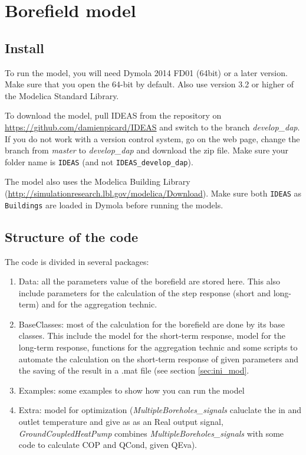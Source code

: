 \documentclass[a4paper,oneside,11pt]{report}
\begin{document}
\chapter*{Borefield model}

\section{Install}
To run the model, you will need Dymola 2014 FD01 (64bit) or a later version. Make sure that you open the 64-bit by default. Also use version 3.2 or higher of the Modelica Standard Library.


To download the model, pull IDEAS from the repository on \url{https://github.com/damienpicard/IDEAS} and switch to the branch \textit{develop\_dap}. If you do not work with a version control system, go on the web page, change the branch from \textit{master} to \textit{develop\_dap} and download the zip file. Make sure your folder name is {\tt IDEAS} (and not {\tt IDEAS\_develop\_dap}). 

The model also uses the Modelica Building Library (\url{http://simulationresearch.lbl.gov/modelica/Download}). Make sure both {\tt IDEAS} as {\tt Buildings} are loaded in Dymola before running the models.

\section{Structure of the code}
The code is divided in several packages:
\begin{enumerate}
\item Data: all the parameters value of the borefield are stored here. This also include parameters for the calculation of the step response (short and long-term) and for the aggregation technic.
\item BaseClasses: most of the calculation for the borefield are done by its base classes. This include the model for the short-term response, model for the long-term response, functions for the aggregation technic and some scripts to automate the calculation on the short-term response of given parameters and the saving of the result in a .mat file (see section \ref{sec:ini_mod}.
\item Examples: some examples to show how you can run the model
\item Extra: model for optimization (\textit{MultipleBoreholes\_signals} caluclate the in and outlet temperature and give as as an Real output signal, \textit{GroundCoupledHeatPump} combines \textit{MultipleBoreholes\_signals} with some code to calculate COP and QCond, given QEva).
\end{enumerate}
\end{document}
